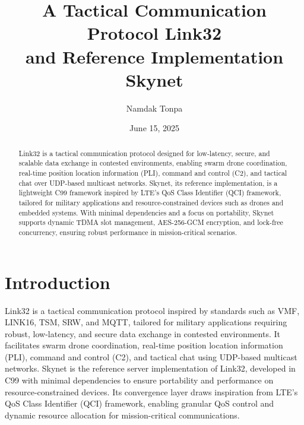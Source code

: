 \documentclass{article}
\begin{document}
\title{A Tactical Communication Protocol Link32 \\ and Reference Implementation Skynet}
\author{Namdak Tonpa}
\date{June 15, 2025}
\maketitle

\begin{abstract}
Link32 is a tactical communication protocol designed for low-latency, secure, and scalable data
exchange in contested environments, enabling swarm drone coordination, real-time position location
information (PLI), command and control (C2), and tactical chat over UDP-based multicast networks.
Skynet, its reference implementation, is a lightweight C99 framework inspired by LTE’s QoS Class
Identifier (QCI) framework, tailored for military applications and resource-constrained devices
such as drones and embedded systems. With minimal dependencies and a focus on portability, Skynet
supports dynamic TDMA slot management, AES-256-GCM encryption, and lock-free concurrency, ensuring
robust performance in mission-critical scenarios.
\end{abstract}

\newpage
\tableofcontents

\newpage
\section{Introduction}
Link32 is a tactical communication protocol inspired by standards such as VMF, LINK16, TSM, SRW, and
MQTT, tailored for military applications requiring robust, low-latency, and secure data exchange in
contested environments. It facilitates swarm drone coordination, real-time position location
information (PLI), command and control (C2), and tactical chat using UDP-based multicast networks.
Skynet is the reference server implementation of Link32, developed in C99 with minimal dependencies
to ensure portability and performance on resource-constrained devices. Its convergence layer draws
inspiration from LTE’s QoS Class Identifier (QCI) framework, enabling granular QoS control and
dynamic resource allocation for mission-critical communications.
\end{document}
